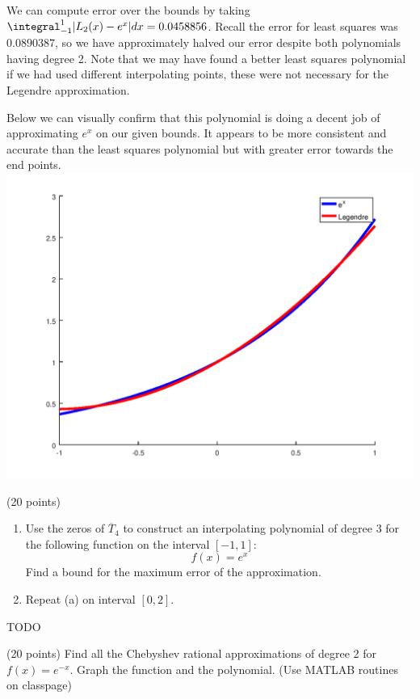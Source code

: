 \documentclass[10pt]{jhwhw}
\begin{document}
	\clearpage
	We can compute error over the bounds by taking $\integral_{-1}^1 |L_2(x) - e^x|dx
	= 0.0458856$. Recall the error for least squares was $0.0890387$, so we have 
	approximately halved our error despite both polynomials having degree 2. Note that
	we may have found a better least squares polynomial if we had used different
	interpolating points, these were not necessary for the Legendre approximation.

	\bigbreak
	Below we can visually confirm that this polynomial is doing a decent job
	of approximating $e^x$ on our given bounds. It appears to be more consistent
	and accurate than the least squares polynomial 
	but with greater error towards the end points.
	\includegraphics[scale=0.75]{p2b}

\problem{} (20 points)

	\begin{enumerate}
		\item Use the zeros of $\overline{T}_4$ to construct an interpolating polynomial of degree
			3 for the following function on the interval $[-1,1]$:
			$$
				f(x) = e^x
			$$
			Find a bound for the maximum error of the approximation.
		\item Repeat (a) on interval $[0, 2]$.
	\end{enumerate}

\solution

	TODO

\problem{} (20 points)
	Find all the Chebyshev rational approximations of degree 2 for $f(x) = e^{-x}$.
	Graph the function and the polynomial. (Use MATLAB routines on classpage)
\end{document}
